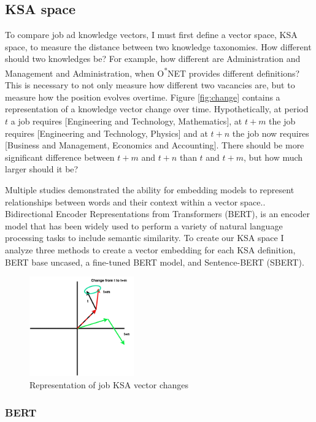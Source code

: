 \documentclass[12pt]{article}
\begin{document}
\subsection{KSA space}

To compare job ad knowledge vectors, I must first define a vector space, KSA space, to measure the distance between two knowledge taxonomies. How different should two knowledges be? For example, how different are Administration and Management and Administration, when O\textsuperscript{*}NET provides different definitions? This is necessary to not only measure how different two vacancies are, but to measure how the position evolves overtime. Figure \ref{fig:change} contains a representation of a knowledge vector change over time. Hypothetically, at period $t$ a job requires [Engineering and Technology, Mathematics], at $t+m$ the job requires [Engineering and Technology, Physics] and at $t+n$ the job now requires [Business and Management, Economics and Accounting]. There should be more significant difference between $t+m$ and $t+n$ than $t$ and $t+m$, but how much larger should it be?

Multiple studies demonstrated the ability for embedding models to represent relationships between words and their context within a vector space.\cite{domain_sepcific_words, word_phrases}. Bidirectional Encoder Representations from Transformers (BERT), is an encoder model that has been widely used to perform a variety of natural language processing tasks to include semantic similarity. To create our KSA space I analyze three methods to create a vector embedding for each KSA definition, BERT base uncased, a fine-tuned BERT model, and Sentence-BERT (SBERT).

\begin{figure}[ht!]
    \centering
    \includegraphics[width=0.4\textwidth]{images/task_change_w_time.png}
    \caption{Representation of job KSA vector changes}
\end{figure}\label{fig:change}

\subsubsection{BERT}
\end{document}
